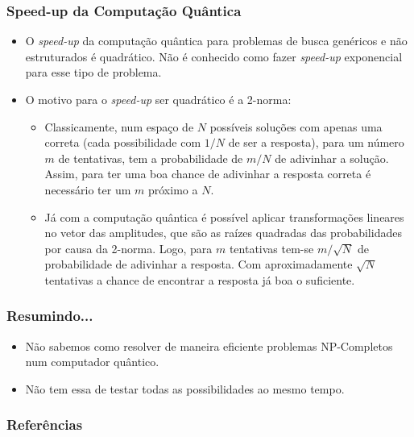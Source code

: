 \documentclass{beamer}
\begin{document}
\begin{frame}
\frametitle{Speed-up da Computação Quântica} 
\begin{itemize}
  \item O \textit{speed-up} da computação quântica para problemas de
  busca genéricos e não estruturados é quadrático. Não é conhecido
  como fazer \textit{speed-up} exponencial para esse tipo de problema.
  \item O motivo para o \textit{speed-up} ser quadrático é a 2-norma:
  \begin{itemize}
  \item Classicamente, num espaço de $N$ possíveis soluções com apenas
    uma correta (cada possibilidade com $1/N$ de ser a resposta), para
    um número $m$ de tentativas, tem a probabilidade de $m/N$ de
    adivinhar a solução. Assim, para ter uma boa chance de
    adivinhar a resposta correta é necessário ter um $m$ próximo a $N$.
  \item Já com a computação quântica é possível aplicar transformações
    lineares no vetor das amplitudes, que são as raízes quadradas das
    probabilidades por causa da 2-norma. Logo, para $m$ tentativas
    tem-se $m/\sqrt{N}$ de probabilidade de adivinhar a resposta. Com
    aproximadamente $\sqrt{N}$ tentativas a chance de encontrar a
    resposta já boa o suficiente.
  \end{itemize}
\end{itemize}
\end{frame}

\begin{frame}
  \frametitle{Resumindo...}
  \begin{itemize}
  \item Não sabemos como resolver de maneira eficiente problemas
    NP-Completos num computador quântico. 
  \item Não tem essa de testar todas as possibilidades ao mesmo tempo.
  \end{itemize}
\end{frame}

\begin{frame}
  \frametitle{Referências}
   
  
\end{frame}
\end{document}
